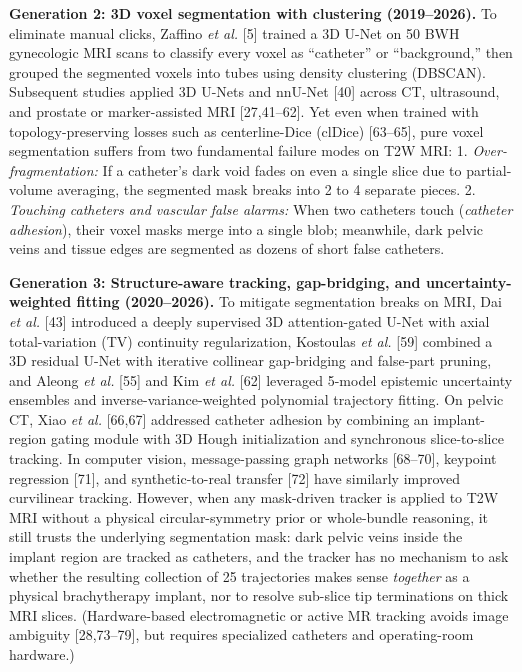 \documentclass[
  11pt,
]{article}
\begin{document}
\textbf{Generation 2: 3D voxel segmentation with clustering
(2019--2026).} To eliminate manual clicks, Zaffino \emph{et al.} {[}5{]}
trained a 3D U-Net on 50 BWH gynecologic MRI scans to classify every
voxel as ``catheter'' or ``background,'' then grouped the segmented
voxels into tubes using density clustering (DBSCAN). Subsequent studies
applied 3D U-Nets and nnU-Net {[}40{]} across CT, ultrasound, and
prostate or marker-assisted MRI {[}27,41--62{]}. Yet even when trained
with topology-preserving losses such as centerline-Dice (clDice)
{[}63--65{]}, pure voxel segmentation suffers from two fundamental
failure modes on T2W MRI: 1. \emph{Over-fragmentation:} If a catheter's
dark void fades on even a single slice due to partial-volume averaging,
the segmented mask breaks into 2 to 4 separate pieces. 2. \emph{Touching
catheters and vascular false alarms:} When two catheters touch
(\emph{catheter adhesion}), their voxel masks merge into a single blob;
meanwhile, dark pelvic veins and tissue edges are segmented as dozens of
short false catheters.

\textbf{Generation 3: Structure-aware tracking, gap-bridging, and
uncertainty-weighted fitting (2020--2026).} To mitigate segmentation
breaks on MRI, Dai \emph{et al.} {[}43{]} introduced a deeply supervised
3D attention-gated U-Net with axial total-variation (TV) continuity
regularization, Kostoulas \emph{et al.} {[}59{]} combined a 3D residual
U-Net with iterative collinear gap-bridging and false-part pruning, and
Aleong \emph{et al.} {[}55{]} and Kim \emph{et al.} {[}62{]} leveraged
5-model epistemic uncertainty ensembles and inverse-variance-weighted
polynomial trajectory fitting. On pelvic CT, Xiao \emph{et al.}
{[}66,67{]} addressed catheter adhesion by combining an implant-region
gating module with 3D Hough initialization and synchronous
slice-to-slice tracking. In computer vision, message-passing graph
networks {[}68--70{]}, keypoint regression {[}71{]}, and
synthetic-to-real transfer {[}72{]} have similarly improved curvilinear
tracking. However, when any mask-driven tracker is applied to T2W MRI
without a physical circular-symmetry prior or whole-bundle reasoning, it
still trusts the underlying segmentation mask: dark pelvic veins inside
the implant region are tracked as catheters, and the tracker has no
mechanism to ask whether the resulting collection of 25 trajectories
makes sense \emph{together} as a physical brachytherapy implant, nor to
resolve sub-slice tip terminations on thick MRI slices. (Hardware-based
electromagnetic or active MR tracking avoids image ambiguity
{[}28,73--79{]}, but requires specialized catheters and operating-room
hardware.)
\end{document}
